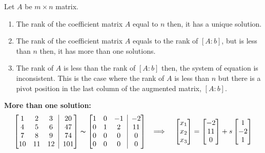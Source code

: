 \documentclass[aima104_lecturenotes_ku.tex]{subfiles}
\begin{document}
Let \(A\) be \(m \times n\) matrix.
\begin{enumerate}
  \item The rank of the coefficient matrix \(A\) equal to \(n\) then, it has a unique solution.
  \item The rank of the coefficient matrix \(A\) equals to the rank of \([A:b]\), but is less than \(n\) then, it has more than one solutions.
\item The rank of \(A\) is less than the rank of \([A:b]\) then, the system of equation is inconsistent. This is the case where the rank of \(A\) is less than \(n\) but there is a pivot position in the last column of the augmented matrix, \([A:b]\).
\end{enumerate}
\textbf{More than one solution:}
$$ \left[ \begin{matrix}
    1 & 2 & 3 \\
    4 & 5 & 6 \\
    7 & 8 & 9 \\
    10 & 11 & 12
\end{matrix} \;\; \vline \;\;
\begin{matrix}
    20\\ 47\\ 74\\ 101
\end{matrix} \right] \thicksim  \left[ \begin{matrix}
    1 & 0 & -1 \\
    0 & 1 & 2 \\
    0 & 0 & 0 \\
    0 & 0 & 0
\end{matrix} \;\; \vline \;\;
\begin{matrix}
    -2\\ 11\\ 0\\ 0
\end{matrix} \right]  \;\;\; \Longrightarrow \hspace{4mm}\begin{bmatrix}
    x_1\\ x_2 \\ x_3
\end{bmatrix} = \begin{bmatrix}
    -2\\ 11 \\0
\end{bmatrix}+ s \begin{bmatrix}
    1\\ -2 \\1
  \end{bmatrix}$$ \vspace{3mm}
\end{document}
